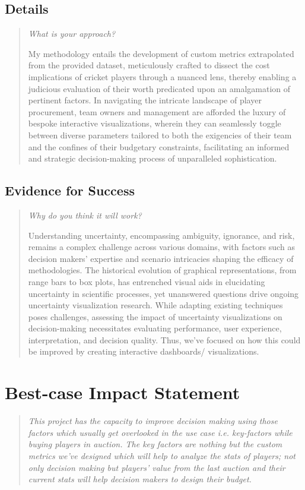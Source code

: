 \documentclass{proc}
\begin{document}
\subsection{Details}
\begin{quote}
\textit{What is your approach?}

My methodology entails the development of custom metrics extrapolated from the provided dataset, meticulously crafted to dissect the cost implications of cricket players through a nuanced lens, thereby enabling a judicious evaluation of their worth predicated upon an amalgamation of pertinent factors. In navigating the intricate landscape of player procurement, team owners and management are afforded the luxury of bespoke interactive visualizations, wherein they can seamlessly toggle between diverse parameters tailored to both the exigencies of their team and the confines of their budgetary constraints, facilitating an informed and strategic decision-making process of unparalleled sophistication.

\end{quote}

\subsection{Evidence for Success}
\begin{quote}
\textit{Why do you think it will work?} 

Understanding uncertainty, encompassing ambiguity, ignorance, and risk, remains a complex challenge across various domains, with factors such as decision makers' expertise and scenario intricacies shaping the efficacy of methodologies. The historical evolution of graphical representations, from range bars to box plots, has entrenched visual aids in elucidating uncertainty in scientific processes, yet unanswered questions drive ongoing uncertainty visualization research. While adapting existing techniques poses challenges, assessing the impact of uncertainty visualizations on decision-making necessitates evaluating performance, user experience, interpretation, and decision quality.
Thus, we've focused on how this could be improved by creating interactive dashboards/ visualizations.

\end{quote}


\section{Best-case Impact Statement}
\begin{quote}

\textit{This project has the capacity to improve decision making using those factors which usually get overlooked in the
use case i.e. key-factors while buying players in auction. The key factors are nothing but the custom metrics we've designed which will help 
to analyze the stats of players; not only decision making but players' value from the last auction and their current stats will help decision makers to design their budget. }
\end{quote}
\end{document}
